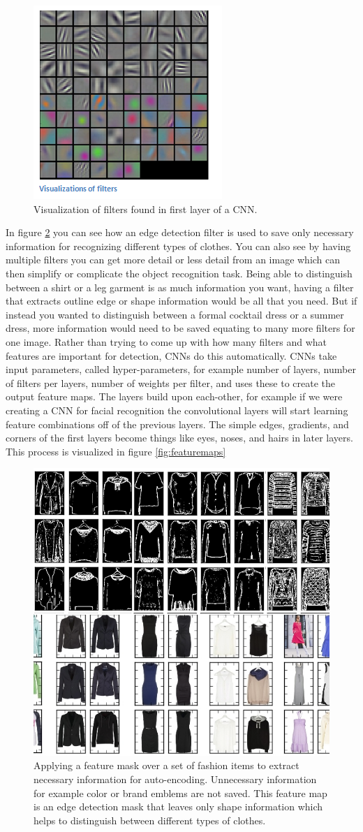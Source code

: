\begin{figure}[htp!]
\centering
\includegraphics[width=.25\textwidth]{figs/conv1vis.png}
\caption{Visualization of filters found in first layer of a CNN.}
\label{fig:curvedetector}
\end{figure} 

In figure \ref{fig:convolution} you can see how an edge detection filter is used to save only necessary information for recognizing different types of clothes. You can also see by having multiple filters you can get more detail or less detail from an image which can then simplify or complicate the object recognition task. Being able to distinguish between a shirt or a leg garment is as much information you want, having a filter that extracts outline edge or shape information would be all that you need. But if instead you wanted to distinguish between a formal cocktail dress or a summer dress, more information would need to be saved equating to many more filters for one image. Rather than trying to come up with how many filters and what features are important for detection, CNNs do this automatically. CNNs take input parameters, called hyper-parameters, for example number of layers, number of filters per layers, number of weights per filter, and uses these to create the output feature maps. The layers build upon each-other, for example if we were creating a CNN for facial recognition the convolutional layers will start learning feature combinations off of the previous layers. The simple edges, gradients, and corners of the first layers become things like eyes, noses, and hairs in later layers. This process is visualized in figure \ref{fig:featuremaps} 

\begin{figure}[t!]
\centering
\includegraphics[width=.48\linewidth]{figs/convolution.png}
\caption{Applying a feature mask over a set of fashion items to extract necessary information for auto-encoding. Unnecessary information for example color or brand emblems are not saved. This feature map is an edge detection mask that leaves only shape information which helps to distinguish between different types of clothes.} 
\label{fig:convolution}
\end{figure}

